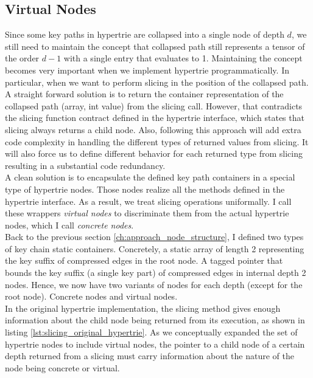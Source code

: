 \subsection{Virtual Nodes}
Since some key paths in hypertrie are collapsed into a single node of depth $d$, we still need to maintain the concept that collapsed path still represents a tensor of the order $d-1$ with a single entry that evaluates to 1. Maintaining the concept becomes very important when we implement hypertrie programmatically. In particular, when we want to perform slicing in the position of the collapsed path. \\

A straight forward solution is to return the container representation of the collapsed path (array, int value) from the slicing call. However, that contradicts the slicing function contract defined in the hypertrie interface, which states that slicing always returns a child node. Also, following this approach will add extra code complexity in handling the different types of returned values from slicing. It will also force us to define different behavior for each returned type from slicing resulting in a substantial code redundancy.  \\

A clean solution is to encapsulate the defined key path containers in a special type of hypertrie nodes. 
Those nodes realize all the methods defined in the hypertrie interface. 
As a result, we treat slicing operations uniformally. 
I call these wrappers \textit{virtual nodes} to discriminate them from the actual hypertrie nodes, which I call \textit{concrete nodes}. \\

Back to the previous section \ref{ch:approach_node_structure}, I defined two types of key chain static containers. 
Concretely, a static array of length 2 representing the key suffix of compressed edges in the root node. 
A tagged pointer that bounds the key suffix (a single key part) of compressed edges in internal depth 2 nodes. 
Hence, we now have two variants of nodes for each depth (except for the root node). Concrete nodes and virtual nodes. \\

In the original hypertrie implementation, the slicing method gives enough information about the child node being returned from its execution, as shown in listing \ref{lst:slicing_original_hypertrie}. 
As we conceptually expanded the set of hypertrie nodes to include virtual nodes, the pointer to a child node of a certain depth returned from a slicing must carry information about the nature of the node being concrete or virtual.

